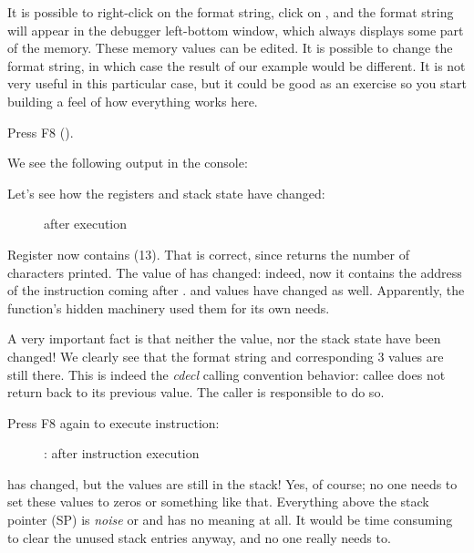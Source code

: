 It is possible to right-click on the format string, click on ,
and the format string will appear in the debugger left-bottom window, which always displays some part of the memory.
These memory values can be edited.
It is possible to change the format string, in which case the result of our example would be different.
It is not very useful in this particular case, but it could be good as an exercise so you start building a feel of how everything works here.

\clearpage
Press F8 (\stepover).

We see the following output in the console:



Let's see how the registers and stack state have changed: 

\begin{figure}[H]
\centering
{}
\caption{\olly after \printf{} execution}
\label{fig:printf3_olly_3}
\end{figure}

Register \EAX now contains  (13).
That is correct, since \printf returns the number of characters printed. 
The value of \EIP has changed: indeed, now it contains the address of the instruction coming after 
.
\ECX and \EDX values have changed as well.
Apparently, the \printf function's hidden machinery used them for its own needs.

A very important fact is that neither the \ESP value, nor the stack state have been changed!
We clearly see that the format string and corresponding 3 values are still there.
This is indeed the \emph{cdecl} calling convention behavior: \gls{callee} does not return \ESP back to its previous value.
The \gls{caller} is responsible to do so.

\clearpage
Press F8 again to execute  instruction:

\begin{figure}[H]
\centering
{}
\caption{\olly: after  instruction execution}
\label{fig:printf3_olly_4}
\end{figure}

\ESP has changed, but the values are still in the stack!
Yes, of course; no one needs to set these values to zeros or something like that.
Everything above the stack pointer (\ac{SP}) 
is \emph{noise} or \emph{\garbage{}} and has no meaning at all.
It would be time consuming to clear the unused stack entries anyway, and no one really needs to.

